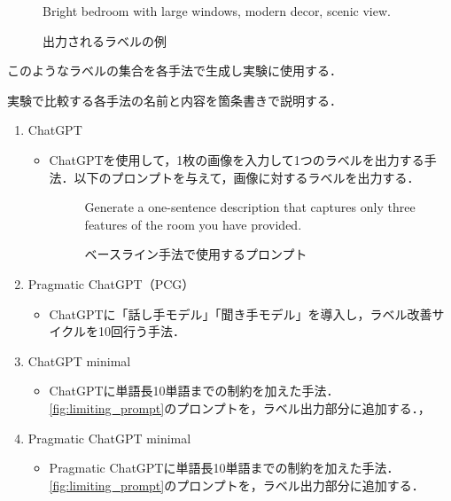 \documentclass[a4paper,11pt]{jreport}
\begin{document}
\begin{figure}[H]
\begin{mdframed}[linewidth=1pt]
Bright bedroom with large windows, modern decor, scenic view.
\end{mdframed}
\caption{出力されるラベルの例}
\label{fig:label_example}
\end{figure}

このようなラベルの集合を各手法で生成し実験に使用する．

実験で比較する各手法の名前と内容を箇条書きで説明する．

\begin{enumerate}
  \item ChatGPT
  \begin{itemize}
  \item ChatGPTを使用して，1枚の画像を入力して1つのラベルを出力する手法．以下のプロンプトを与えて，画像に対するラベルを出力する．
  \begin{figure}[H]
    \begin{mdframed}[linewidth=1pt]
      Generate a one-sentence description that captures only three features of the room you have provided.
    \end{mdframed}
    \caption{ベースライン手法で使用するプロンプト}
    \label{fig:baseline_prompt}
  \end{figure}
\end{itemize}
  
  \item Pragmatic ChatGPT（PCG）
  \begin{itemize}
    \item ChatGPTに「話し手モデル」「聞き手モデル」を導入し，ラベル改善サイクルを10回行う手法．
  \end{itemize}
    
  \item ChatGPT minimal
  \begin{itemize}
    \item ChatGPTに単語長10単語までの制約を加えた手法．\ref{fig:limiting_prompt}のプロンプトを，ラベル出力部分に追加する．，
  \end{itemize}
  
  \item Pragmatic ChatGPT minimal
  \begin{itemize}
    \item Pragmatic ChatGPTに単語長10単語までの制約を加えた手法．\ref{fig:limiting_prompt}のプロンプトを，ラベル出力部分に追加する．
  \end{itemize}
  
\end{enumerate}
\end{document}

